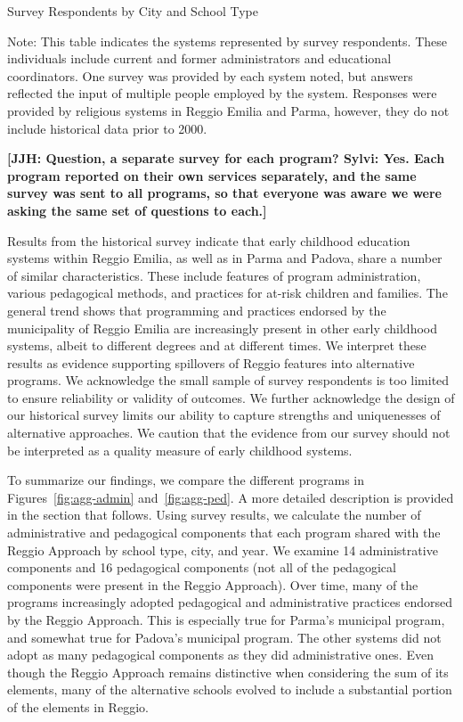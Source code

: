 \begin{table}[H]
\centering
\caption{Survey Respondents by City and School Type}\label{tab:respondents}
\begin{threeparttable}
	
\begin{tablenotes}
Note: This table indicates the systems represented by survey respondents. These individuals include current and former administrators and educational coordinators. One survey was provided by each system noted, but answers reflected the input of multiple people employed by the system. Responses were provided by religious systems in Reggio Emilia and Parma, however, they do not include historical data prior to 2000.
\end{tablenotes}
\end{threeparttable}
\end{table}

\textbf{[JJH: Question, a separate survey for each program? Sylvi: Yes. Each program reported on their own services separately, and the same survey was sent to all programs, so that everyone was aware we were asking the same set of questions to each.]}

Results from the historical survey indicate that early childhood education systems within Reggio Emilia, as well as in Parma and Padova, share a number of similar characteristics. These include features of program administration, various pedagogical methods, and practices for at-risk children and families. The general trend shows that programming and practices endorsed by the municipality of Reggio Emilia are increasingly present in other early childhood systems, albeit to different degrees and at different times. We interpret these results as evidence supporting spillovers of Reggio features into alternative programs. We acknowledge the small sample of survey respondents is too limited to ensure reliability or validity of outcomes. We further acknowledge the design of our historical survey limits our ability to capture strengths and uniquenesses of alternative approaches. We caution that the evidence from our survey should not be interpreted as a quality measure of early childhood systems.

To summarize our findings, we compare the different programs in Figures~\ref{fig:agg-admin} and~\ref{fig:agg-ped}. A more detailed description is provided in the section that follows. Using survey results, we calculate the number of administrative and pedagogical components that each program shared with the Reggio Approach by school type, city, and year. We examine 14 administrative components and 16 pedagogical components (not all of the pedagogical components were present in the Reggio Approach). Over time, many of the programs increasingly adopted pedagogical and administrative practices endorsed by the Reggio Approach. This is especially true for Parma's municipal program, and somewhat true for Padova's municipal program. The other systems did not adopt as many pedagogical components as they did administrative ones. Even though the Reggio Approach remains distinctive when considering the sum of its elements, many of the alternative schools evolved to include a substantial portion of the elements in Reggio.

